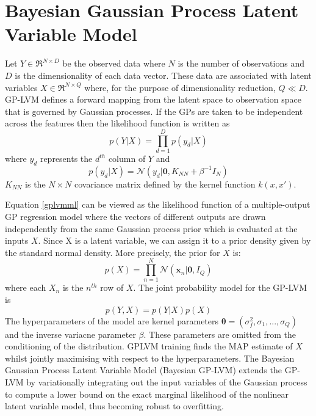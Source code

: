 \documentclass[ %
                    author={Dillon Keith Diep},
                supervisor={Dr. Carl Henrik Ek},
                    degree={MEng},
                     title={Assisted Content Generation for 3D Hair Geometry},
                  subtitle={[INCOMPLETE DRAFT, CONTAINS NOTES FROM RESEARCH]},
                      type={Research},
                      year={2014} ]{dissertation}
\begin{document}
\section{Bayesian Gaussian Process Latent Variable Model}
\iffalse
	Let $Y \in \Re^{N \times D}$ be the observed data where $N$ is the number of observations and $D$ is the dimensionality of each data vector. These data are associated with latent variables $X \in \Re^{N \times Q}$ where, for the purpose of dimensionality reduction, $Q \ll D$. GP-LVM defines a forward mapping from the latent space to observation space that is governed by Gaussian processes. If the GPs are taken to be independent across the features then the likelihood function is written as 
	\begin{equation} \label{gplvmml}
		p(Y|X)=\prod^{D}_{d=1}p(y_d|X)
	\end{equation}
	where $y_d$ represents the $d^{th}$ column of $Y$ and
	\begin{equation}
		p(y_d|X)=\mathcal{N}(y_d|\mathbf{0}, K_{NN}+\beta^{-1}I_{N})
	\end{equation}
	$K_{NN}$ is the $N\times N$ covariance matrix defined by the kernel function $k(x,x')$.
	
	Equation \ref{gplvmml} can be viewed as the likelihood function of a multiple-output GP regression model where the vectors of different outputs are drawn independently from the same Gaussian process prior which is evaluated at the inputs $X$. Since X is a latent variable, we can assign it to a prior density given by the standard normal density. More precisely, the prior for $X$ is:
	\begin{equation}
		p(X)=\prod^N_{n=1}\mathcal{N}(\mathbf{x}_n|\mathbf{0}, I_Q)
	\end{equation}
	where each $X_n$ is the $n^{th}$ row of $X$. The joint probability model for the GP-LVM is
	\begin{equation}
	p(Y,X)=p(Y|X)p(X)
	\end{equation}
	The hyperparameters of the model are kernel parameters $\mathbf{\theta}=(\sigma^2_f, \sigma_1,...,\sigma_Q)$ and the inverse variacne parameter $\beta$. These parameters are omitted from the conditioning of the distribution. GPLVM training finds the MAP estimate of $X$ whilst jointly maximising with respect to the hyperparameters.
	The Bayesian Gaussian Process Latent Variable Model (Bayesian GP-LVM) extends the GP-LVM by variationally integrating out the input variables of the Gaussian process to compute a lower bound on the exact marginal likelihood of the nonlinear latent variable model, thus becoming robust to overfitting. \cite{bgplvm}
	
\end{document}
